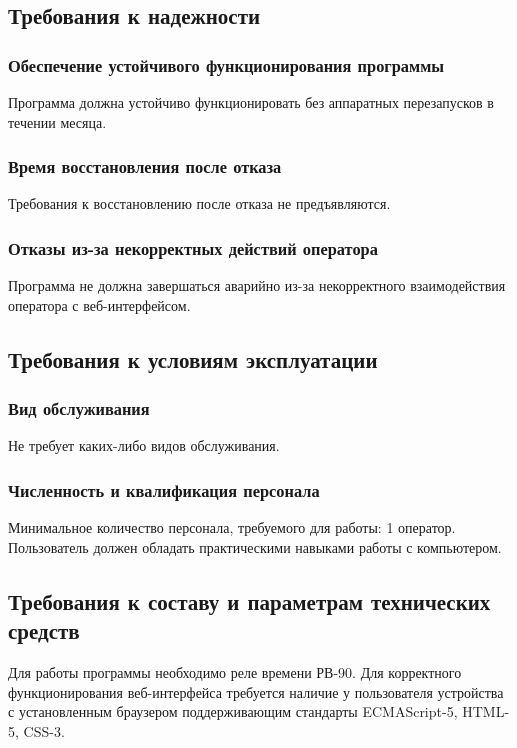 \subsection{Требования к надежности}
\subsubsection{Обеспечение устойчивого функционирования программы}
Программа должна устойчиво функционировать без аппаратных перезапусков в течении месяца.

\subsubsection{Время восстановления после отказа}
Требования к восстановлению после отказа не предъявляются.

\subsubsection{Отказы из-за некорректных действий оператора}
Программа не должна завершаться аварийно из-за некорректного взаимодействия оператора с веб-интерфейсом.


\subsection{Требования к условиям эксплуатации}
\subsubsection{Вид обслуживания}
Не требует каких-либо видов обслуживания.

\subsubsection{Численность и квалификация персонала}
Минимальное количество персонала, требуемого для работы: 1 оператор. Пользователь должен обладать практическими навыками работы с компьютером.

\subsection{Требования к составу и параметрам технических средств}
Для работы программы необходимо реле времени РВ-90. Для корректного функционирования веб-интерфейса требуется наличие у пользователя устройства с установленным браузером поддерживающим стандарты ECMAScript-5, HTML-5, CSS-3.


